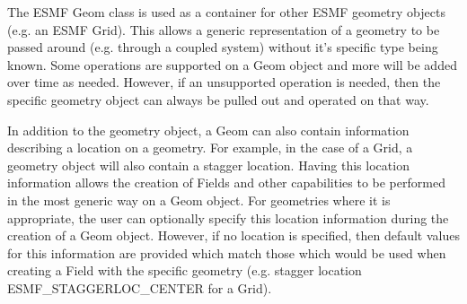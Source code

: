 %

The ESMF Geom class is used as a container for other ESMF geometry objects (e.g. an ESMF Grid). This allows a generic
representation of a geometry to be passed around (e.g. through a coupled system) without it's specific type being known.
Some operations are supported on a Geom object and more will be added over time as needed. However, if
an unsupported operation is needed, then the specific geometry object can always be pulled out and operated on that way.

In addition to the geometry object, a Geom can also contain information describing a location on a geometry. For example, in the case of
a Grid, a geometry object will also contain a stagger location. Having this location information allows the creation of Fields and
other capabilities to be performed in the most generic way on a Geom object. For geometries where it is appropriate, the user can
optionally specify this location information during the creation of a Geom object. However, if no location is specified, then default values for
this information are provided which match those which would be used when creating a Field with the specific geometry
(e.g. stagger location ESMF\_STAGGERLOC\_CENTER for a Grid).
